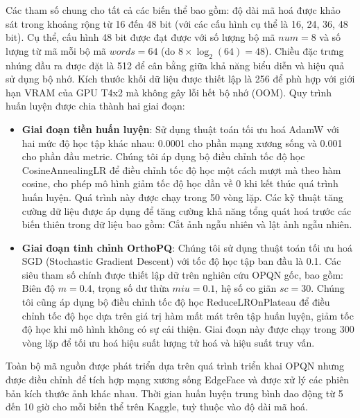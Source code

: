 Các tham số chung cho tất cả các biến thể bao gồm: độ dài mã hoá được khảo sát trong khoảng rộng từ 16 đến 48 bit (với các cấu hình cụ thể là 16, 24, 36, 48 bit). Cụ thể, cấu hình 48 bit được đạt được với số lượng bộ mã $num=8$ và số lượng từ mã mỗi bộ mã $words=64$ (do $8 \times \log_2(64) = 48$). Chiều đặc trưng nhúng đầu ra được đặt là 512 để cân bằng giữa khả năng biểu diễn và hiệu quả sử dụng bộ nhớ. Kích thước khối dữ liệu được thiết lập là 256 để phù hợp với giới hạn VRAM của GPU T4x2 mà không gây lỗi hết bộ nhớ (OOM). Quy trình huấn luyện được chia thành hai giai đoạn:
\begin{itemize}
    \item \textbf{Giai đoạn tiền huấn luyện}: Sử dụng thuật toán tối ưu hoá AdamW với hai mức độ học tập khác nhau: 0.0001 cho phần mạng xương sống và 0.001 cho phần đầu metric. Chúng tôi áp dụng bộ điều chỉnh tốc độ học CosineAnnealingLR để điều chỉnh tốc độ học một cách mượt mà theo hàm cosine, cho phép mô hình giảm tốc độ học dần về 0 khi kết thúc quá trình huấn luyện. Quá trình này được chạy trong 50 vòng lặp. Các kỹ thuật tăng cường dữ liệu được áp dụng để tăng cường khả năng tổng quát hoá trước các biến thiên trong dữ liệu bao gồm: Cắt ảnh ngẫu nhiên và lật ảnh ngẫu nhiên. 
    \item \textbf{Giai đoạn tinh chỉnh OrthoPQ}: Chúng tôi sử dụng thuật toán tối ưu hoá SGD (Stochastic Gradient Descent) với tốc độ học tập ban đầu là 0.1. Các siêu tham số chính được thiết lập dữ trên nghiên cứu OPQN gốc, bao gồm: Biên độ $m = 0.4$, trọng số dư thừa $miu = 0.1$, hệ số co giãn $sc = 30$. Chúng tôi cũng áp dụng bộ điều chỉnh tốc độ học ReduceLROnPlateau để điều chỉnh tốc độ học dựa trên giá trị hàm mất mát trên tập huấn luyện, giảm tốc độ học khi mô hình không có sự cải thiện. Giai đoạn này được chạy trong 300 vòng lặp để tối ưu hoá hiệu suất lượng tử hoá và hiệu suất truy vấn. 
\end{itemize}

Toàn bộ mã nguồn được phát triển dựa trên quá trình triển khai OPQN nhưng được điều chỉnh để tích hợp mạng xương sống EdgeFace và được xử lý các phiên bản kích thước ảnh khác nhau. Thời gian huấn luyện trung bình dao động từ 5 đến 10 giờ cho mỗi biến thể trên Kaggle, tuỳ thuộc vào độ dài mã hoá. 


